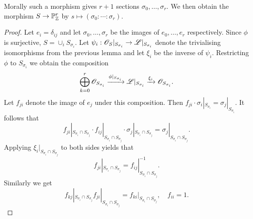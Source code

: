\documentclass{memoir}
\begin{document}
\begin{remark}
    Morally such a morphism gives $r+1$ sections $\sigma_0,\dots,\sigma_r$. 
    We then obtain the morphism $S\to \mathbb{P}^r_{\mathbb{Z}}$ by $s\mapsto (\sigma_0:\cdots:\sigma_r)$.
\end{remark}
\begin{proof}
    Let $e_i = \delta_{ij}$ and let $\sigma_0,\dots,\sigma_r$ be the images of $e_0,\dots,e_r$ respectively.
    Since $\phi$ is surjective, $S = \cup_iS_{\sigma_i}$.
    Let $\psi_i:\mathscr{O}_S|_{S_{\sigma_i}}\to \mathscr{L}|_{S_{\sigma_i}}$ denote the trivialising isomorphisms from the previous lemma and let $\xi_i$ be the inverse of $\psi_i$.
    Restricting $\phi$ to $S_{\sigma_i}$ we obtain the composition
    \begin{equation}
        \label{eq:aff}
        \bigoplus_{k=0}^r\mathscr{O}_{S_{\sigma_i}} \xrightarrow{\phi|_{S_{\sigma_i}}} \mathscr{L}|_{S_{\sigma_i}} \xrightarrow{\xi_i} \mathscr{O}_{S_{\sigma_i}}.
    \end{equation}
    Let $f_{ji}$ denote the image of $e_j$ under this composition.
    Then $f_{ji}\cdot\sigma_i|_{S_{\sigma_i}} = \sigma_j|_{S_{\sigma_i}}$.
    It follows that 
    \begin{equation}
        f_{ji}|_{S_{\sigma_i}\cap S_{\sigma_j}} \cdot f_{ij}|_{S_{\sigma_i}\cap S_{\sigma_j}} \cdot \sigma_j|_{S_{\sigma_i}\cap S_{\sigma_j}} = \sigma_j|_{S_{\sigma_i}\cap S_{\sigma_j}}.
    \end{equation}
    Applying $\xi_i|_{S_{\sigma_i}\cap S_{\sigma_j}}$ to both sides yields that 
    \begin{equation}
        f_{ji}|_{S_{\sigma_i}\cap S_{\sigma_j}}  = f_{ij}|_{S_{\sigma_i}\cap S_{\sigma_j}}^{-1}.
    \end{equation}
    Similarly we get 
    \begin{equation}
        f_{kj}|_{S_{\sigma_i}\cap S_{\sigma_j}}f_{ji}|_{S_{\sigma_i}\cap S_{\sigma_j}} = f_{ki}|_{S_{\sigma_i}\cap S_{\sigma_j}}, \quad f_{ii} = 1.
    \end{equation}


\end{proof}
\end{document}
